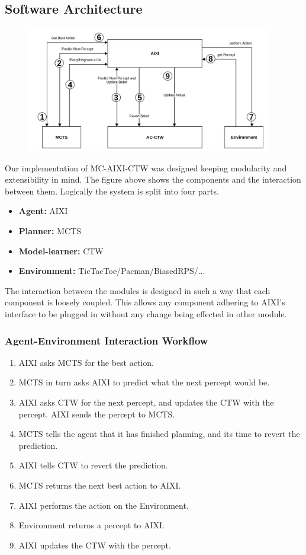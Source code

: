 \documentclass{article}
\theoremstyle{definition}
\newtheorem{primary statistics}[definition]{Primary Statistics}
\newtheorem{auxiliary statistics}[definition]{Auxiliary Statistics}
\begin{document}
\subsection{Software Architecture}

\begin{figure}[h]
    \centering
    \includegraphics[height=5.5cm]{soft_arch_crop}    
\end{figure}

Our implementation of MC-AIXI-CTW was designed keeping modularity and extensibility in mind. The figure above shows the components and the interaction between them. Logically the system is split into four parts. 
\begin{itemize}
    \item \textbf{Agent: } AIXI
    \item \textbf{Planner: } MCTS
    \item \textbf{Model-learner: } CTW
    \item \textbf{Environment: } TicTacToe/Pacman/BiasedRPS/...
\end{itemize}

The interaction between the modules is designed in such a way that each component is loosely coupled. This allows any component adhering to AIXI's interface to be plugged in without any change being effected in other module.

\subsubsection*{Agent-Environment Interaction Workflow}
\begin{enumerate}
    \item AIXI asks MCTS for the best action.
    \item MCTS in turn asks AIXI to predict what the next percept would be.
    \item AIXI asks CTW for the next percept, and updates the CTW with the percept. AIXI sends the percept to MCTS.
    \item MCTS tells the agent that it has finished planning, and its time to revert the prediction.
    \item AIXI tells CTW to revert the prediction.
    \item MCTS returns the next best action to AIXI.
    \item AIXI performs the action on the Environment.
    \item Environment returns a percept to AIXI.
    \item AIXI updates the CTW with the percept.
\end{enumerate}
\end{document}
